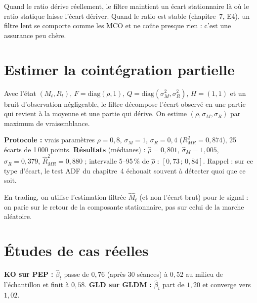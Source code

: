 Quand le ratio dérive réellement, le filtre maintient un écart stationnaire là où le ratio statique laisse l'écart dériver. Quand le ratio est stable (chapitre~7, E4), un filtre lent se comporte comme les MCO et ne coûte presque rien : c'est une assurance peu chère.

\section{Estimer la cointégration partielle}

Avec l'état $(M_t, R_t)$, $F = \mathrm{diag}(\rho,1)$, $Q = \mathrm{diag}(\sigma_M^2,\sigma_R^2)$, $H = (1,1)$ et un bruit d'observation négligeable, le filtre décompose l'écart observé en une partie qui revient à la moyenne et une partie qui dérive. On estime $(\rho,\sigma_M,\sigma_R)$ par maximum de vraisemblance.

\begin{codebox}
\textbf{Protocole :} vrais paramètres $\rho = 0{,}8$, $\sigma_M = 1$, $\sigma_R = 0{,}4$ ($R^2_{MR} = 0{,}874$), 25 écarts de 1\,000 points. \textbf{Résultats} (médianes) : $\hat\rho = 0{,}801$, $\hat\sigma_M = 1{,}005$, $\hat\sigma_R = 0{,}379$, $\hat R^2_{MR} = 0{,}880$ ; intervalle 5–95\,\% de $\hat\rho$ : $[0{,}73\,;\,0{,}84]$. Rappel : sur ce type d'écart, le test ADF du chapitre~4 échouait souvent à détecter quoi que ce soit.
\end{codebox}

En trading, on utilise l'estimation filtrée $\hat M_t$ (et non l'écart brut) pour le signal : on parie sur le retour de la composante stationnaire, pas sur celui de la marche aléatoire.

\section{Études de cas réelles}

\begin{codebox}[ — E4, ratio de Kalman sur données réelles ($\log$-prix, $\delta = 10^{-5}$)]
\textbf{KO sur PEP :} $\hat\beta_t$ passe de $0{,}76$ (après 30 séances) à $0{,}52$ au milieu de l'échantillon et finit à $0{,}58$. \textbf{GLD sur GLDM :} $\hat\beta_t$ part de $1{,}20$ et converge vers $1{,}02$.
\end{codebox}

